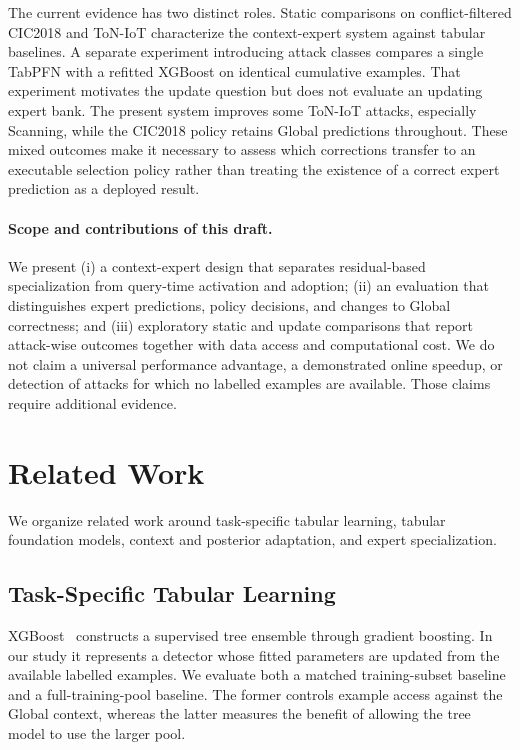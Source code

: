 \documentclass[sigconf,anonymous,pbalance]{acmart}
\begin{document}
The current evidence has two distinct roles. Static comparisons on conflict-filtered CIC2018 and ToN-IoT characterize the context-expert system against tabular baselines. A separate experiment introducing attack classes compares a single TabPFN with a refitted XGBoost on identical cumulative examples. That experiment motivates the update question but does not evaluate an updating expert bank. The present system improves some ToN-IoT attacks, especially Scanning, while the CIC2018 policy retains Global predictions throughout. These mixed outcomes make it necessary to assess which corrections transfer to an executable selection policy rather than treating the existence of a correct expert prediction as a deployed result.

\paragraph{Scope and contributions of this draft.}
We present (i) a context-expert design that separates residual-based specialization from query-time activation and adoption; (ii) an evaluation that distinguishes expert predictions, policy decisions, and changes to Global correctness; and (iii) exploratory static and update comparisons that report attack-wise outcomes together with data access and computational cost. We do not claim a universal performance advantage, a demonstrated online speedup, or detection of attacks for which no labelled examples are available. Those claims require additional evidence.

\section{Related Work}
\label{sec:related}
We organize related work around task-specific tabular learning, tabular foundation models, context and posterior adaptation, and expert specialization.

\subsection{Task-Specific Tabular Learning}
XGBoost~\cite{chen2016xgboost} constructs a supervised tree ensemble through gradient boosting. In our study it represents a detector whose fitted parameters are updated from the available labelled examples. We evaluate both a matched training-subset baseline and a full-training-pool baseline. The former controls example access against the Global context, whereas the latter measures the benefit of allowing the tree model to use the larger pool.
\end{document}
